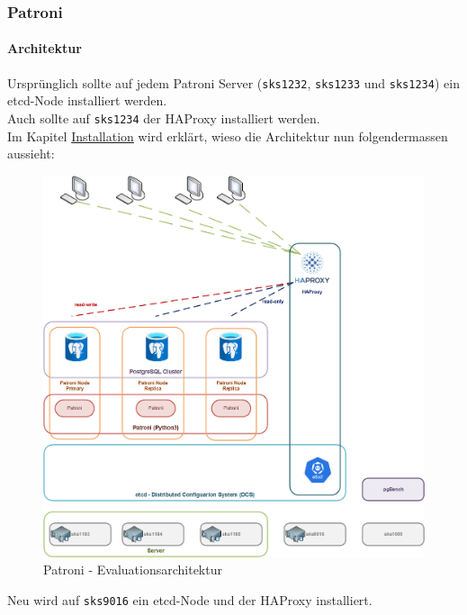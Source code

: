
\clearpage
{}
\recalctypearea
\begin{flushleft}
    \subsubsection{Patroni}
    \paragraph{Architektur}
    Ursprünglich sollte auf jedem Patroni Server (\texttt{sks1232}, \texttt{sks1233} und \texttt{sks1234}) ein \gls{etcd}-Node installiert werden.\\
    Auch sollte auf \texttt{sks1234} der \Gls{HAProxy} installiert werden.\\
    Im Kapitel \hyperref[par:patroni_installation]{Installation} wird erklärt, wieso die Architektur nun folgendermassen aussieht:
    \begin{figure}[H]
        \centering
        \includegraphics[width=0.8\linewidth]{source/implementation/evaluation/postgresql_ha_solutions/patroni/patroni-evaluation-architecture}
        \caption{Patroni - Evaluationsarchitektur}
        \label{fig:patroni-evaluation-architecture.png}
    \end{figure}
    Neu wird auf \texttt{sks9016} ein \gls{etcd}-Node und der \Gls{HAProxy} installiert.
\end{flushleft}
\clearpage
{}
